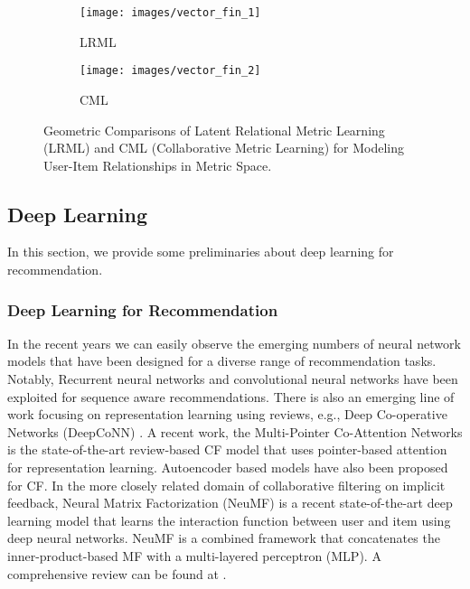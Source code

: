 \documentclass[sigconf]{acmart}
\begin{document}
 \begin{figure}[H]
\centering
\begin{subfigure}{0.25\textwidth}
  \centering
  \texttt{[image: images/vector\_fin\_1]}

  \caption{\textsc{LRML}}

  \label{fig:sub1}
\end{subfigure}\begin{subfigure}{0.25\textwidth}
  \centering
  \texttt{[image: images/vector\_fin\_2]}
    \caption{CML}
  \label{fig:sub2}
\end{subfigure}
\caption{Geometric Comparisons of Latent Relational Metric Learning (LRML) and CML (Collaborative Metric Learning) for Modeling User-Item Relationships in Metric Space. }
\label{fig:vector}
\end{figure}


\subsection{Deep Learning}
In this section, we provide some preliminaries about deep learning for recommendation. 
\subsubsection{Deep Learning for Recommendation}
 In the recent years we can easily observe the emerging numbers of neural network models that have been designed for a diverse range of recommendation tasks. Notably, Recurrent neural networks \cite{DBLP:conf/wsdm/WuABSJ17} and convolutional neural networks \cite{Tang:2018:PTS:3159652.3159656} have been exploited for sequence aware recommendations. There is also an emerging line of work focusing on representation learning using reviews, e.g., Deep Co-operative Networks (DeepCoNN) \cite{DBLP:conf/wsdm/ZhengNY17}. A recent work, the Multi-Pointer Co-Attention Networks \cite{DBLP:journals/corr/abs-1801-09251} is the state-of-the-art review-based CF model that uses pointer-based attention for representation learning. Autoencoder based models \cite{DBLP:conf/kdd/LiS17,Zhang:2017:AEH:3077136.3080689} have also been proposed for CF. In the more closely related domain of collaborative filtering on implicit feedback, Neural Matrix Factorization (NeuMF) \cite{He:2017:NCF:3038912.3052569} is a recent state-of-the-art deep learning model that learns the interaction function between user and item using deep neural networks. NeuMF is a combined framework that concatenates the inner-product-based MF with a multi-layered perceptron (MLP). A comprehensive review can be found at \cite{zhang2017deep}.
\end{document}
